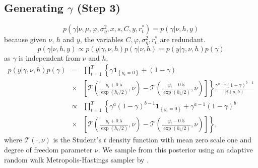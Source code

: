 \documentclass[12pt]{article}
\newcommand\mathbbm[1]{\mathbf{#1}}
\begin{document}
\subsection{Generating  $\gamma$ (Step 3)}
\begin{equation}
p(\gamma | \nu, \mu ,\varphi,\sigma^{2}_{\eta},x , s, C, y,r^{*}_{t})=p(\gamma | \nu, h, y)
\end{equation}
because given $\nu$, $h$ and $y$, the variables $C,\varphi,\sigma^{2}_{\eta}, r^{*}_{t} $ are redundant. 
\begin{equation}
p(\gamma | \nu, h, y)
\propto p(y|\gamma,\nu ,h) p(\gamma|\nu,h)= p(y|\gamma, \nu, h)p(\gamma)
\end{equation}
as  $\gamma$ is independent from $\nu$ and  $h$. 
\begin{eqnarray}
p(y|\gamma,\nu,h)p(\gamma)&=&\prod \limits_{t=1}^{T} \left\{ \gamma \mathbbm{1}_{\left\{y_t =0 \right\}} + (1-\gamma) \right. \nonumber \\
&\times & \left. \left[\mathcal{T}\left(\frac{y_t+0.5}{\exp(h_t/2)}, \nu\right) -\mathcal{T}\left(\frac{y_t-0.5}{\exp(h_t/2)}, \nu\right)  \right]  \right\} \frac{\gamma^{a-1}(1-\gamma)^{b-1}}{\text{B}(a,b)} \nonumber \\
&\propto& \prod \limits_{t=1}^{T} \left\{ \gamma^{a}(1-\gamma)^{b-1} \mathbbm{1}_{\left\{y_t =0 \right\}} + \gamma^{a-1}(1-\gamma)^{b}  \right. \nonumber \\
&\times& \left.    \left[\mathcal{T}\left(\frac{y_t+0.5}{\exp(h_t/2)}, \nu\right) -\mathcal{T}\left(\frac{y_t-0.5}{\exp(h_t/2)}, \nu\right)  \right]  \right\}, \nonumber 
\end{eqnarray}
where $\mathcal{T}(\cdot ,\nu)$ is the Student's $t$ density function with mean zero scale one and degree of freedom parameter $\nu$. We sample from this posterior using an adaptive random walk Metropolis-Hastings sampler by \citet{RobertsRosenthal2009}.
\end{document}
